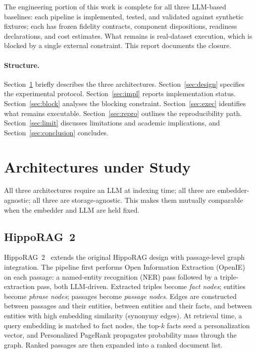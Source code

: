 \documentclass[11pt,a4paper]{article}
\begin{document}
The engineering portion of this work is complete for all three LLM-based baselines: each pipeline is implemented, tested, and validated against synthetic fixtures; each has frozen fidelity contracts, component dispositions, readiness declarations, and cost estimates. What remains is real-dataset execution, which is blocked by a single external constraint. This report documents the closure.

\paragraph{Structure.}
Section~\ref{sec:arch} briefly describes the three architectures. Section~\ref{sec:design} specifies the experimental protocol. Section~\ref{sec:impl} reports implementation status. Section~\ref{sec:block} analyses the blocking constraint. Section~\ref{sec:exec} identifies what remains executable. Section~\ref{sec:repro} outlines the reproducibility path. Section~\ref{sec:limit} discusses limitations and academic implications, and Section~\ref{sec:conclusion} concludes.

\section{Architectures under Study}
\label{sec:arch}

All three architectures require an LLM at indexing time; all three are embedder-agnostic; all three are storage-agnostic. This makes them mutually comparable when the embedder and LLM are held fixed.

\subsection{HippoRAG~2}

HippoRAG~2~\cite{hipporag2} extends the original HippoRAG design with passage-level graph integration. The pipeline first performs Open Information Extraction (OpenIE) on each passage: a named-entity recognition (NER) pass followed by a triple-extraction pass, both LLM-driven. Extracted triples become \emph{fact nodes}; entities become \emph{phrase nodes}; passages become \emph{passage nodes}. Edges are constructed between passages and their entities, between entities and their facts, and between entities with high embedding similarity (synonymy edges). At retrieval time, a query embedding is matched to fact nodes, the top-$k$ facts seed a personalization vector, and Personalized PageRank propagates probability mass through the graph. Ranked passages are then expanded into a ranked document list.
\end{document}

